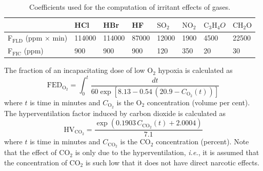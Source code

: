 \documentclass[12pt,a4paper,final,twoside]{stylevk}
\begin{document}
\begin{table}[ht]
\caption{Coefficients used for the computation of irritant effects of
  gases.}\label{tbl:FIC} 
\begin{center}
\begin{tabular}{|l|l|l|l|l|l|l|l|}
\hline 
& HCl & HBr & HF & $\textrm{SO}_2$ & $\textrm{NO}_2$ &
 $ \textrm{C}_3 \textrm{H}_4 O $ & $\textrm{CH}_2\textrm{O}$  \\ \hline \hline 
F${}_\mathrm{FLD}$ (ppm $\times$ min) & 114000 & 114000 & 87000 &
12000 & 1900 & 4500 & 22500 \\ 
F${}_\mathrm{FIC}$ (ppm) & 900 & 900 & 900 & 120 & 350 & 20 & 30 \\
\hline 
\end{tabular}
\end{center}
\end{table}

The fraction of an incapacitating dose of low O${}_2$ hypoxia is
calculated as
%
\begin{equation}
  \mathrm{FED}_\mathrm{O_2} = \int_0^t \frac{dt}{60 \exp \left [ 8.13
      - 0.54 \, (20.9 - C_\mathrm{O_2}(t)) \right ] }
\end{equation}
%
where $t$ is time in minutes and $C_\mathrm{O_2}$ is the O${}_2$
concentration (volume per cent).  The hyperventilation factor induced
by carbon dioxide is calculated as
%
\begin{equation}
  \mathrm{HV}_\mathrm{CO_2} = \frac{ \exp( 0.1903 \,
    C_\mathrm{CO_2}(t) + 2.0004 ) }{7.1} \label{co2hyp}
\end{equation}
%
where $t$ is time in minutes and $C_\mathrm{CO_2}$ is the CO${}_2$
concentration (percent).  Note that the effect of CO${}_2$ is only due
to the hyperventilation, \emph{i.e.}, it is assumed that the
concentration of CO${}_2$ is such low that it does not have direct
narcotic effects.

\end{document}
